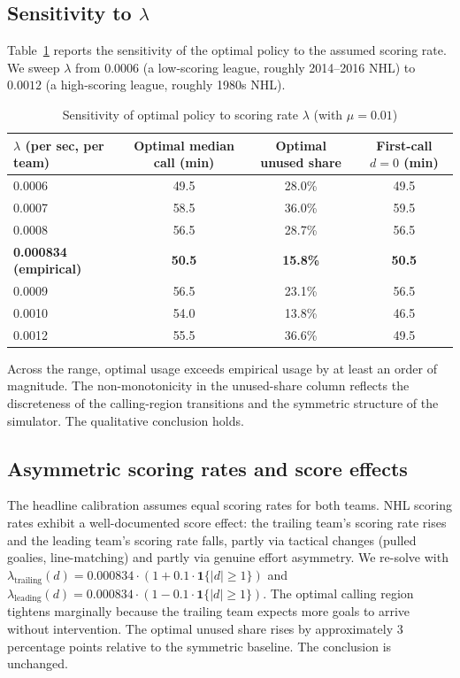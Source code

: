 \documentclass[11pt]{article}
\begin{document}
\subsection{Sensitivity to $\lambda$}

Table~\ref{tab:lambda} reports the sensitivity of the optimal policy to the assumed scoring rate. We sweep $\lambda$ from $0.0006$ (a low-scoring league, roughly 2014--2016 NHL) to $0.0012$ (a high-scoring league, roughly 1980s NHL).

\begin{table}[ht]
\centering
\caption{Sensitivity of optimal policy to scoring rate $\lambda$ (with $\mu = 0.01$)}
\label{tab:lambda}
\begin{tabular}{lccc}
\toprule
$\lambda$ (per sec, per team) & Optimal median call (min) & Optimal unused share & First-call $d=0$ (min) \\
\midrule
0.0006 & 49.5 & 28.0\% & 49.5 \\
0.0007 & 58.5 & 36.0\% & 59.5 \\
0.0008 & 56.5 & 28.7\% & 56.5 \\
\textbf{0.000834 (empirical)} & \textbf{50.5} & \textbf{15.8\%} & \textbf{50.5} \\
0.0009 & 56.5 & 23.1\% & 56.5 \\
0.0010 & 54.0 & 13.8\% & 46.5 \\
0.0012 & 55.5 & 36.6\% & 49.5 \\
\bottomrule
\end{tabular}
\end{table}

Across the range, optimal usage exceeds empirical usage by at least an order of magnitude. The non-monotonicity in the unused-share column reflects the discreteness of the calling-region transitions and the symmetric structure of the simulator. The qualitative conclusion holds.

\subsection{Asymmetric scoring rates and score effects}

The headline calibration assumes equal scoring rates for both teams. NHL scoring rates exhibit a well-documented score effect: the trailing team's scoring rate rises and the leading team's scoring rate falls, partly via tactical changes (pulled goalies, line-matching) and partly via genuine effort asymmetry. We re-solve with $\lambda_{\text{trailing}}(d) = 0.000834 \cdot (1 + 0.1 \cdot \mathbf{1}\{|d| \geq 1\})$ and $\lambda_{\text{leading}}(d) = 0.000834 \cdot (1 - 0.1 \cdot \mathbf{1}\{|d| \geq 1\})$. The optimal calling region tightens marginally because the trailing team expects more goals to arrive without intervention. The optimal unused share rises by approximately 3 percentage points relative to the symmetric baseline. The conclusion is unchanged.
\end{document}
